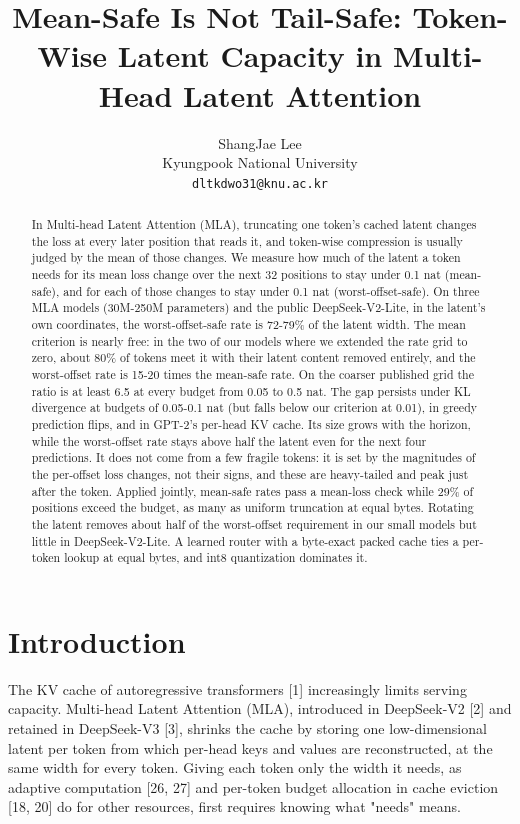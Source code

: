 \documentclass[11pt]{article}
\title{Mean-Safe Is Not Tail-Safe: Token-Wise Latent Capacity in Multi-Head Latent Attention}
\author{ShangJae Lee \\ Kyungpook National University \\ \texttt{dltkdwo31@knu.ac.kr}}
\date{}
\begin{document}
\maketitle

\begin{abstract}
In Multi-head Latent Attention (MLA), truncating one token's cached latent changes the loss at every later position that reads it, and token-wise compression is usually judged by the mean of those changes. We measure how much of the latent a token needs for its mean loss change over the next 32 positions to stay under 0.1 nat (mean-safe), and for each of those changes to stay under 0.1 nat (worst-offset-safe). On three MLA models (30M-250M parameters) and the public DeepSeek-V2-Lite, in the latent's own coordinates, the worst-offset-safe rate is 72-79\% of the latent width. The mean criterion is nearly free: in the two of our models where we extended the rate grid to zero, about 80\% of tokens meet it with their latent content removed entirely, and the worst-offset rate is 15-20 times the mean-safe rate. On the coarser published grid the ratio is at least 6.5 at every budget from 0.05 to 0.5 nat. The gap persists under KL divergence at budgets of 0.05-0.1 nat (but falls below our criterion at 0.01), in greedy prediction flips, and in GPT-2's per-head KV cache. Its size grows with the horizon, while the worst-offset rate stays above half the latent even for the next four predictions. It does not come from a few fragile tokens: it is set by the magnitudes of the per-offset loss changes, not their signs, and these are heavy-tailed and peak just after the token. Applied jointly, mean-safe rates pass a mean-loss check while 29\% of positions exceed the budget, as many as uniform truncation at equal bytes. Rotating the latent removes about half of the worst-offset requirement in our small models but little in DeepSeek-V2-Lite. A learned router with a byte-exact packed cache ties a per-token lookup at equal bytes, and int8 quantization dominates it.
\end{abstract}

\section{Introduction}

The KV cache of autoregressive transformers [1] increasingly limits serving capacity. Multi-head Latent Attention (MLA), introduced in DeepSeek-V2 [2] and retained in DeepSeek-V3 [3], shrinks the cache by storing one low-dimensional latent per token from which per-head keys and values are reconstructed, at the same width for every token. Giving each token only the width it needs, as adaptive computation [26, 27] and per-token budget allocation in cache eviction [18, 20] do for other resources, first requires knowing what "needs" means.
\end{document}
